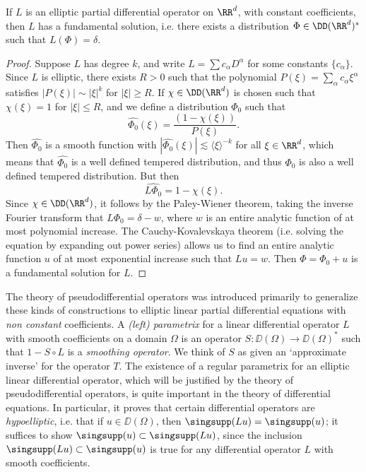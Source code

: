 \begin{theorem}
    If $L$ is an elliptic partial differential operator on $\RR^d$, with constant coefficients, then $L$ has a fundamental solution, i.e. there exists a distribution $\Phi \in \DD(\RR^d)^*$ such that $L(\Phi) = \delta$.
\end{theorem}
\begin{proof}
    Suppose $L$ has degree $k$, and write $L = \sum c_\alpha D^\alpha$ for some constants $\{ c_\alpha \}$. Since $L$ is elliptic, there exists $R > 0$ such that the polynomial $P(\xi) = \sum_\alpha c_\alpha \xi^\alpha$ satisfies $|P(\xi)| \sim |\xi|^k$ for $|\xi| \geq R$. If $\chi \in \DD(\RR^d)$ is chosen such that $\chi(\xi) = 1$ for $|\xi| \leq R$, and we define a distribution $\Phi_0$ such that
    \[ \widehat{\Phi_0}(\xi) = \frac{(1 - \chi(\xi))}{P(\xi)}. \]
    Then $\widehat{\Phi_0}$ is a smooth function with $|\widehat{\Phi_0}(\xi)| \lesssim \langle \xi \rangle^{-k}$ for all $\xi \in \RR^d$, which means that $\widehat{\Phi_0}$ is a well defined tempered distribution, and thus $\Phi_0$ is also a well defined tempered distribution. But then
    \[ \widehat{L \Phi_0} = 1 - \chi(\xi). \]
    Since $\chi \in \DD(\RR^d)$, it follows by the Paley-Wiener theorem, taking the inverse Fourier transform that $L \Phi_0 = \delta - w$, where $w$ is an entire analytic function of at most polynomial increase. The Cauchy-Kovalevskaya theorem (i.e. solving the equation by expanding out power series) allows us to find an entire analytic function $u$ of at most exponential increase such that $Lu = w$. Then $\Phi = \Phi_0 + u$ is a fundamental solution for $L$.
\end{proof}

The theory of pseudodifferential operators was introduced primarily to generalize these kinds of constructions to elliptic linear partial differential equations with \emph{non constant} coefficients. A \emph{(left) parametrix} for a linear differential operator $L$ with smooth coefficients on a domain $\Omega$ is an operator $S: \DD(\Omega) \to \DD(\Omega)^*$ such that $1 - S \circ L$ is a \emph{smoothing operator}. We think of $S$ as given an `approximate inverse' for the operator $T$. The existence of a regular parametrix for an elliptic linear differential operator, which will be justified by the theory of pseudodifferential operators, is quite important in the theory of differential equations. In particular, it proves that certain differential operators are \emph{hypoelliptic}, i.e. that if $u \in \DD(\Omega)$, then $\singsupp(Lu) = \singsupp(u)$; it suffices to show $\singsupp(u) \subset \singsupp(Lu)$, since the inclusion $\singsupp(Lu) \subset \singsupp(u)$ is true for any differential operator $L$ with smooth coefficients.

